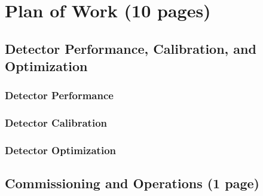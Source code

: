 \section{Plan of Work (10 pages)}
\label{sec:planofwork}




\subsection{Detector Performance, Calibration, and Optimization}

\subsubsection{Detector Performance}

\subsubsection{Detector Calibration}

\subsubsection{Detector Optimization}

\subsection{Commissioning and Operations (1 page)}
